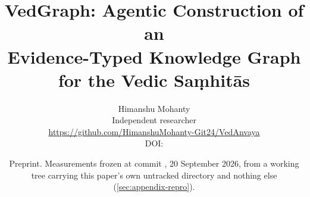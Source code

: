 \title{\vspace{-1.4cm}\bfseries VedGraph: Agentic Construction of an\\
Evidence-Typed Knowledge Graph for the Vedic Sa\d{m}hit\=as}

\author{%
  Himanshu Mohanty\\[2pt]
  \small Independent researcher\\
  \small \url{https://github.com/HimanshuMohanty-Git24/VedAnvaya}\\[1pt]
  \small DOI: \href{https://doi.org/10.5281/zenodo.22896781}{}
}
\date{\small Preprint. Measurements frozen at commit ,
20 September 2026, from a working tree carrying this paper's own untracked
directory and nothing else (\cref{sec:appendix-repro}).}

\maketitle
\thispagestyle{fancy}

